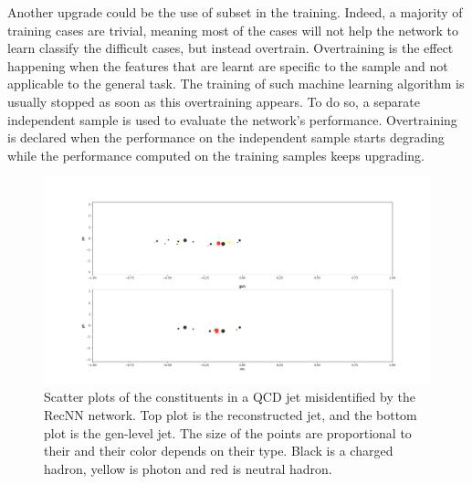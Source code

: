Another upgrade could be the use of subset in the training. Indeed, a majority of training cases are trivial, meaning most of the cases will not help the network to learn classify the difficult cases, but instead overtrain. Overtraining is the effect happening when the features that are learnt are specific to the sample and not applicable to the general task. The training of such machine learning algorithm is usually stopped as soon as this overtraining appears. To do so, a separate independent sample is used to evaluate the network's performance. Overtraining is declared when the performance on the independent sample starts degrading while the performance computed on the training samples keeps upgrading.

\begin{figure}
    \centering
    \includegraphics[width=\textwidth]{Images/jet_display1.png}
    \caption{Scatter plots of the constituents in a QCD jet misidentified by the RecNN network. Top plot is the reconstructed jet, and the bottom plot is the gen-level jet. The size of the points are proportional to their \pt and their color depends on their type. Black is a charged hadron, yellow is photon and red is neutral hadron.}
    \label{fig:jet_display}
\end{figure}